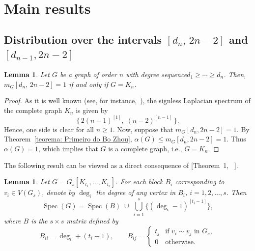 \documentclass[preprint,12pt]{elsarticle}
\newtheorem{lemma}[theorem]{Lemma}
\begin{document}
\section{Main results}

\subsection{Distribution over the intervals $[d_n,\,2n-2]$ and $[d_{n-1}, 2n-2]$
} \label{subsec:31}

\vspace{0.3cm}

\begin{lemma} \label{corolario: grafo completo}
Let \( G \) be a graph of order $n$ with degree sequence\linebreak \( d_1 \geq \cdots \geq d_n \). Then, \( m_G [d_n,\, 2n-2] = 1 \) if and only if \( G = K_n \).
\end{lemma}


\begin{proof}
As it is well known (see, for instance,~\cite{Brouwer2012}), the signless Laplacian spectrum of the complete graph $K_n$ is given by 
\[
\{\,2(n-1)^{[1]},\; (n-2)^{[n-1]}\,\}.
\]
Hence, one side is clear for all $n \geq 1$. Now, suppose that $m_G[d_n, 2n-2] = 1$. By Theorem~\ref{teorema: Primeiro do Bo Zhou}, \( \alpha(G) \leq m_G[d_n, 2n-2] = 1 \). Thus \( \alpha(G) = 1 \), which implies that \( G \) is a complete graph, i.e., \( G = K_n \). 
\end{proof}



The following result can be viewed as a {direct consequence of [Theorem~1, ~\cite{LiZhou2017}].}


\begin{lemma}\label{lemma: spectrum of G_s}
Let $G = G_s[K_{t_1},\dots,K_{t_s}]$. For each block $B_i$ corresponding to $v_i \in V(G_s)$, denote by $\deg_i$ the degree of any vertex in $B_i$, $i=1,2,\dots,s$. Then
\[
\operatorname{Spec}(G) = \operatorname{Spec}(B) \;\cup\; \bigcup_{i=1}^s \{(\deg_i - 1)^{[t_i-1]}\},
\]
where $B$ is the $s \times s$ matrix defined by
\[
B_{ii} = \deg_i + (t_i - 1), \qquad
B_{ij} =
\begin{cases}
t_j & \text{if } v_i \sim v_j \text{ in } G_s,\\[2mm]
0 & \text{otherwise.}
\end{cases}
\]
\end{lemma}
\end{document}
